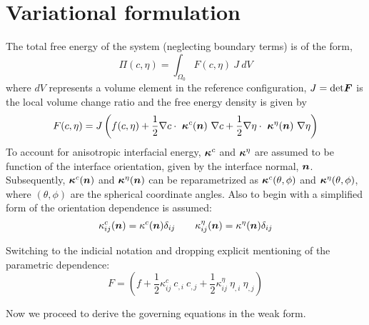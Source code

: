 \section{Variational formulation}
The total free energy of the system (neglecting boundary terms) is of the form,
\begin{equation}
\Pi(c, \eta) = \int_{\Omega_0} F(c, \eta) ~J~dV 
\end{equation}
where $dV$ represents a volume element in the reference configuration, $J= \text{det} \mbox{\boldmath$ F$}$ is the local volume change ratio and the free energy density is given by
\begin{equation}
 F(c, \eta) = J \left(  f(c, \eta) + \frac{1}{2} \nabla  c  \cdot ~\mbox{\boldmath$\kappa$}^c(\mbox{\boldmath$ n$}) ~\nabla  c + \frac{1}{2} \nabla  \eta  \cdot ~\mbox{\boldmath$\kappa$}^{\eta}(\mbox{\boldmath$ n$}) ~\nabla  \eta \right)
\end{equation}
To account for anisotropic interfacial energy, $\mbox{\boldmath$\kappa$}^c$ and $\mbox{\boldmath$\kappa$}^{\eta}$ are assumed to be function of the interface orientation, given by the interface normal, $\mbox{\boldmath$ n$}$. Subsequently, $\mbox{\boldmath$\kappa$}^c(\mbox{\boldmath$ n$})$ and $\mbox{\boldmath$\kappa$}^{\eta}(\mbox{\boldmath$ n$})$ can be reparametrized as $\mbox{\boldmath$\kappa$}^c(\theta, \phi)$ and $\mbox{\boldmath$\kappa$}^{\eta}(\theta, \phi)$, where $(\theta, \phi)$ are the spherical coordinate angles. Also to begin with a simplified form of the orientation dependence is assumed:
\begin{equation}
 \kappa^c_{ij} (\mbox{\boldmath$ n$}) = \kappa^c(\mbox{\boldmath$ n$}) \delta_{ij} \qquad  \kappa^{\eta}_{ij} (\mbox{\boldmath$ n$}) = \kappa^{\eta}(\mbox{\boldmath$ n$}) \delta_{ij}
\end{equation}

\noindent Switching to the indicial notation and dropping explicit mentioning of the parametric dependence:
\begin{equation}
 F =  \left( f + \frac{1}{2} \kappa^c_{ij}~c_{,i}~c_{,j} + \frac{1}{2} \kappa^{\eta}_{ij} ~\eta_{,i} ~\eta_{,j} \right) 
\end{equation}

\noindent Now we proceed to derive the governing equations in the weak form.

